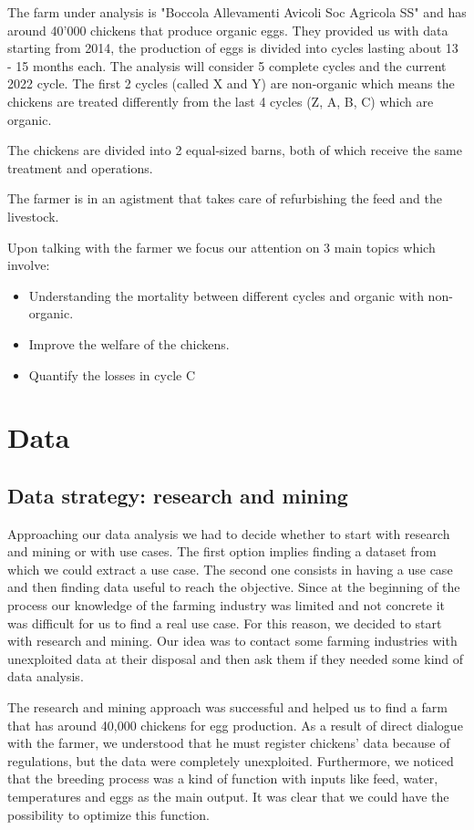 \documentclass[11pt]{article}
\begin{document}
The farm under analysis is "Boccola Allevamenti Avicoli Soc Agricola SS" and has around 40'000 chickens that produce organic eggs. They provided us with data starting from 2014, the production of eggs is divided into cycles lasting about 13 - 15 months each. The analysis will consider 5 complete cycles and the current 2022 cycle. The first 2 cycles (called X and Y) are non-organic which means the chickens are treated differently from the last 4 cycles (Z, A, B, C) which are organic.

The chickens are divided into 2 equal-sized barns, both of which receive the same treatment and operations.

The farmer is in an agistment that takes care of refurbishing the feed and the livestock.

Upon talking with the farmer we focus our attention on 3 main topics which involve:
\begin{itemize}
    \item Understanding the mortality between different cycles and organic with non-organic.
    \item Improve the welfare of the chickens.
    \item Quantify the losses in cycle C
\end{itemize}

\section{Data}

\subsection{Data strategy: research and mining}

Approaching our data analysis we had to decide whether to start with research and mining or with use cases. The first option implies finding a dataset from which we could extract a use case.
The second one consists in having a use case and then finding data useful to reach the objective.
Since at the beginning of the process our knowledge of the farming industry was limited and not concrete it was difficult for us to find a real use case. For this reason, we decided to start with 
research and mining. Our idea was to contact some farming industries with unexploited data at their disposal and then ask them if they needed some kind of data analysis.

The research and mining approach was successful and helped us to find a farm that has around 40,000 chickens for egg production.
As a result of direct dialogue with the farmer, we understood that he must register chickens' data because of regulations, but the data were completely unexploited.
Furthermore, we noticed that the breeding process was a kind of function with inputs like feed, water, temperatures and eggs as the main output.
It was clear that we could have the possibility to optimize this function.
\end{document}
